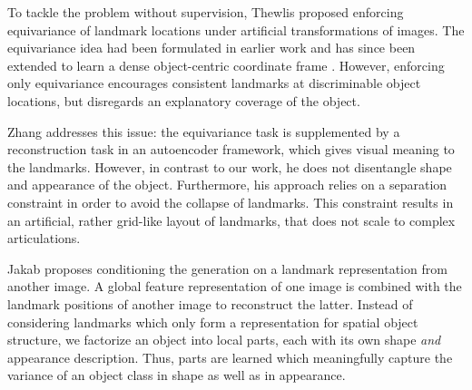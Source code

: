 	To tackle the problem without supervision, Thewlis \etal \cite{Thewlis:2017wi} proposed enforcing equivariance of landmark locations under artificial transformations of images. The equivariance idea had been formulated in earlier work \cite{Lenc:2016tz} and has since been extended to learn a dense object-centric coordinate frame \cite{Thewlis:2017wg}. However, enforcing only equivariance encourages consistent landmarks at %
	discriminable object locations,
	but disregards an explanatory coverage of the object.

	Zhang \etal \cite{Zhang:2018vz} addresses this issue: the equivariance task is supplemented by a reconstruction task in an autoencoder framework, which gives visual meaning to the landmarks. However, in contrast to our work, he does not disentangle shape and appearance of the object. Furthermore, his approach relies on a separation constraint in order to avoid the collapse of landmarks.
	This constraint results in an artificial, rather grid-like layout of landmarks, that does not scale to complex articulations.

	Jakab \etal \cite{Jakab:2018wc} proposes conditioning the generation on a landmark representation from another image. A global feature representation of one image is combined with the landmark positions of another image to reconstruct the latter. Instead of considering landmarks which only form a representation for spatial object structure, we factorize an object into local parts, each with its own shape \textit{and} appearance description.
	Thus, parts are learned which meaningfully capture the variance of an object class in shape as well as in appearance.

